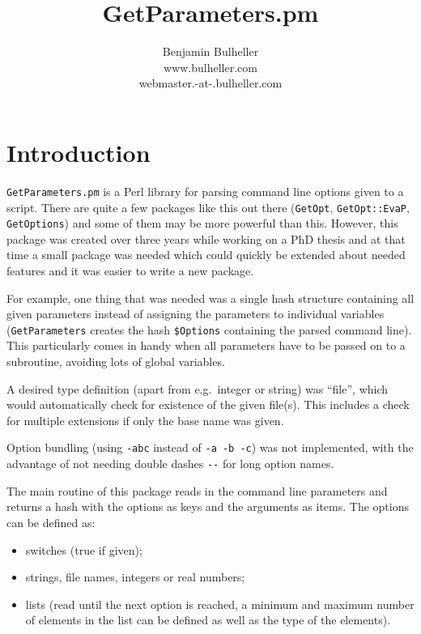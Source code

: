 \documentclass[12pt, a4paper]{article}
\title{GetParameters.pm}
\author{Benjamin Bulheller\\ \small www.bulheller.com\\ \small webmaster.-at-.bulheller.com}
\begin{document}
\maketitle

\tableofcontents

\newpage


\section{Introduction}

\verb'GetParameters.pm' is a Perl library for parsing command line options given to a script. There are quite a few packages like this out there (\verb'GetOpt', \verb'GetOpt::EvaP', \verb'GetOptions') and some of them may be more powerful than this. However, this package was created over three years while working on a PhD thesis and at that time a small package was needed which could quickly be extended about needed features and it was easier to write a new package.

For example, one thing that was needed was a single hash structure containing all given parameters instead of assigning the parameters to individual variables (\verb'GetParameters' creates the hash \verb'$Options' containing the parsed command line). This particularly comes in handy when all parameters have to be passed on to a subroutine, avoiding lots of global variables.

A desired type definition (apart from e.g.\ integer or string) was ``file'', which would automatically check for existence of the given file(s). This includes a check for multiple extensions if only the base name was given.

Option bundling (using \texttt{-abc} instead of \texttt{-a -b -c}) was not implemented, with the advantage of not needing double dashes \verb'--' for long option names.

The main routine of this package reads in the command line parameters and returns a hash with the options as keys and the arguments as items. The options can be defined as:

\begin{itemize}
\item switches (true if given);
\item strings, file names, integers or real numbers;
\item lists (read until the next option is reached,  a minimum and maximum number of elements in the list can be defined as well as the type of the elements).
\end{itemize}
\end{document}
